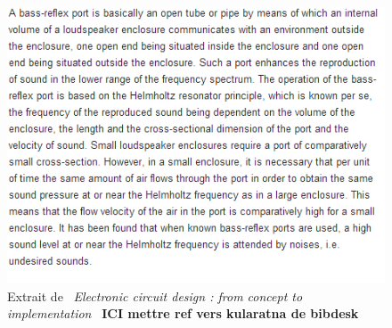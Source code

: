 \begin{figure}
\begin{center}
\includegraphics{img/Trace 3-US 1961149 A.png}
\end{center}
\caption{Extrait de \, \textit{\og Electronic circuit design : from concept to implementation\fg} \, \textbf{ICI mettre ref vers kularatna de bibdesk}} 
 \label{Trace 3}
\end{figure}





\

\

 
 
 
 
 


